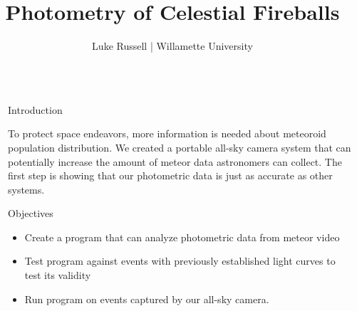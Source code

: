\documentclass[final]{beamer}
\title{Photometry of Celestial Fireballs} %
\author{Luke Russell | Willamette University} %
\newlength{\sepwid}
\newlength{\twocolwid}
\begin{document}

\setlength{\belowcaptionskip}{0ex} %
\setlength\belowdisplayshortskip{2ex} %

\begin{frame}[t] %

\begin{columns}[t] %

\begin{column}{\sepwid}\end{column} %

\begin{column}{\twocolwid} %



\begin{block}{Introduction}

To protect space endeavors, more information is needed about meteoroid population distribution. We created a portable all-sky camera system that can potentially increase the amount of meteor data astronomers can collect. The first step is showing that our photometric data is just as accurate as other systems.

\end{block}

\begin{alertblock}{Objectives}

 \begin{itemize}
\item Create a program that can analyze photometric data from meteor video
\item Test program against events with previously established light curves to test its validity
\item Run program on events captured by our all-sky camera. 
\end{itemize}


\end{alertblock}
\end{column}
\end{columns}
\end{frame}
\end{document}
